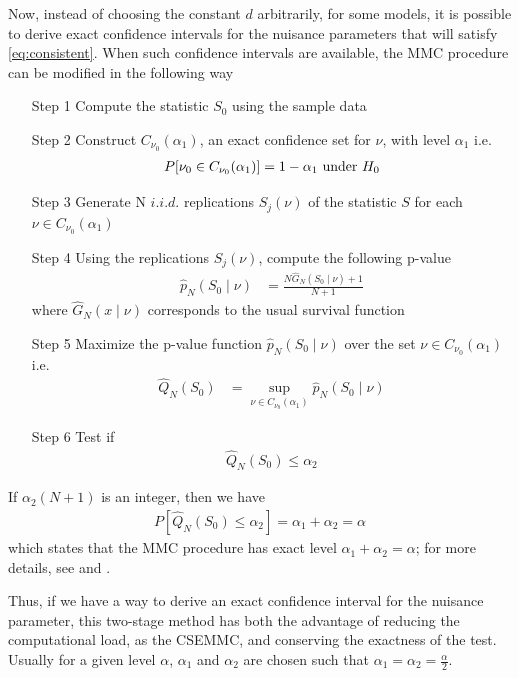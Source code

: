 \documentclass[11pt]{article}\usepackage[]{graphicx}\usepackage[]{color}
\begin{document}
Now, instead of choosing the constant $d$ arbitrarily, for some models, it is possible to derive exact confidence intervals for the nuisance parameters that will satisfy \ref{eq:consistent}. When such confidence intervals are available, the MMC procedure can be modified in the following way
\begin{itemize}
	\item[Step 1] Compute the statistic $S_0$ using the sample data
	\item[Step 2] Construct $C_{\nu_0}(\alpha_1)$, an exact confidence set for $\nu$, with level $\alpha_1$ i.e.
	\begin{align}
	P[\nu_0 \in C_{\nu_0}(\alpha_1)] = 1 - \alpha_1 \textnormal{ under } H_0
	\end{align}
	\item[Step 3] Generate N $i.i.d.$ replications $S_{j}(\nu)$ of the statistic $S$ for each $\nu \in C_{\nu_0}(\alpha_1)$
	\item[Step 4] Using the replications $S_{j}(\nu)$, compute the following p-value
	\begin{align}
	\hat{p}_{N}(S_{0} \mid \nu) & = \frac{N\hat{G}_{N}(S_{0} \mid \nu)+1}{N+1}
	\end{align}
	where $\hat{G}_{N}(x \mid \nu)$ corresponds to the usual survival function

	\item[Step 5] Maximize the p-value function $\hat{p}_{N}(S_{0} \mid \nu)$ over the set $\nu \in C_{\nu_0}(\alpha_1)$ i.e.
	\begin{align}
	\hat{Q}_{N}(S_0) & = \sup_{\nu \in  C_{\nu_0}(\alpha_1)} \hat{p}_{N}(S_{0} \mid \nu)
	\end{align}

	\item[Step 6] Test if
	\begin{align}
	\hat{Q}_{N}(S_{0})\leq \alpha_2
	\end{align}
\end{itemize}

If $\alpha_2(N+1)$ is an integer, then we have
\begin{align}
P [\hat{Q}_{N}(S_{0}) \leq \alpha_2] = \alpha_1+\alpha_2 = \alpha
\end{align}
which states that the MMC procedure has exact level $\alpha_1 + \alpha_2 = \alpha$; for more details, see \cite{dufour_exact_1996} and \cite{dufour_monte_2006}.

Thus, if we have a way to derive an exact confidence interval for the nuisance parameter, this two-stage method has both the advantage of reducing the computational load, as the CSEMMC, and conserving the exactness of the test. Usually for a given level $\alpha$, $\alpha_1$ and $\alpha_2$ are chosen such that $\alpha_1=\alpha_2=\frac{\alpha}{2}$.
\end{document}
